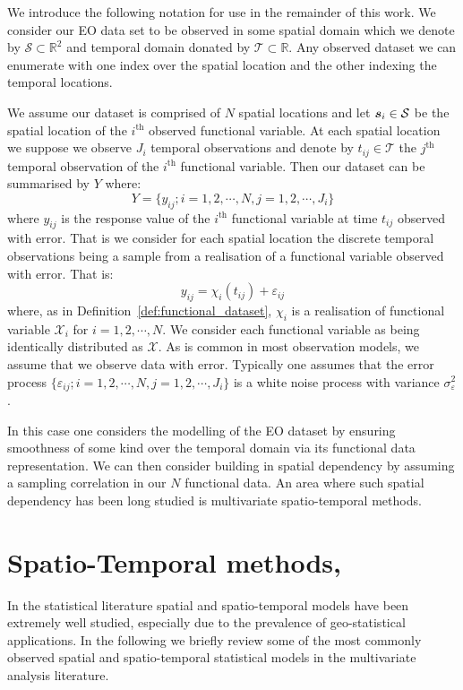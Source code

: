 We introduce the following notation for use in the remainder of this work.
We consider our EO data set to be observed in some spatial domain which we denote by $\mathcal{S} \subset \mathbb{R}^2$ and temporal domain donated by $\mathcal{T} \subset \mathbb{R}$.
Any observed dataset we can enumerate with one index over the spatial location and the other indexing the temporal locations.

We assume our dataset is comprised of $N$ spatial locations and let $\bm{{s}}_i \in \mathcal{S}$ be the spatial location of the $i^\text{th}$ observed functional variable.
At each spatial location we suppose we observe $J_i$ temporal observations and denote by $t_{ij} \in \mathcal{T}$ the $j^\text{th}$ temporal observation of the $i^\text{th}$ functional variable.
Then our dataset can be summarised by $Y$ where:
\begin{equation}
	Y = \{ y_{ij}; i=1,2,\cdots,N, j=1,2, \cdots, J_i \}
	\label{eqn:observed_data}
\end{equation}
where $y_{ij}$ is the response value of the $i^\text{th}$ functional variable at time $t_{ij}$ observed with error.
That is we consider for each spatial location the discrete temporal observations being a sample from a realisation of a functional variable observed with error.
That is:
\begin{equation}
	y_{ij} = \chi_{i}\left( t_{ij} \right) + \varepsilon_{ij}
	\label{eqn:fd_temporal}
\end{equation}
where, as in Definition~\ref{def:functional_dataset}, $\chi_i$ is a realisation of functional variable $\mathcal{X}_i$ for $i=1,2,\cdots,N$.
We consider each functional variable as being identically distributed as $\mathcal{X}$.
As is common in most observation models, we assume that we observe data with error.
Typically one assumes that the error process $\{\varepsilon_{ij}; i=1,2,\cdots,N, j=1,2,\cdots,J_i\}$ is a white noise process with variance $\sigma_\varepsilon^2$. 

In this case one considers the modelling of the EO dataset by ensuring smoothness of some kind over the temporal domain via its functional data representation.
We can then consider building in spatial dependency by assuming a sampling correlation in our $N$ functional data.
An area where such spatial dependency has been long studied is multivariate spatio-temporal methods.

\section{Spatio-Temporal methods, \label{sec:st_methods}}
In the statistical literature spatial and spatio-temporal models have been extremely well studied, especially due to the prevalence of geo-statistical applications.
In the following we briefly review some of the most commonly observed spatial and spatio-temporal statistical models in the multivariate analysis literature. 

